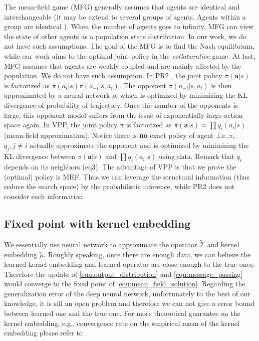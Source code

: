 \documentclass[11pt,a4paper]{article}
\theoremstyle{definition}
\begin{document}
The mean-field game (MFG) \citep{huang2006large} generally assumes that agents are identical and interchangeable (it may be extend to several groups of agents.  Agents within a group are identical ). When the number of agents goes to infinity,  MFG can view the state of other agents as a population state distribution. In our work, we do not have such assumptions. The goal of the MFG is to find the Nash equilibrium, while our work aims to the optimal joint policy in the \emph{collaborative} game. At last, MFG assumes that agents are weakly coupled and are mainly affected by the population. We do not have such assumption. In PR2 \citep{wen2018probabilistic}, the joint policy $ \pi(\bm{a}|s)$ is factorized as $\pi(a_i|s)\pi(a_{-i}|s,a_{i})$. The opponent $\pi(a_{-i}|s,a_{i})$ is then approximated  by a neural network $\rho$, which is  optimized by minimizing the KL divergence of probability of trajectory. Once the number of the opponents is large, this opponent model  suffers from the issue of exponentially large action space again. In VPP, the joint policy $\pi$ is factorized as $\pi(\bm{a}|s)\approx \prod q_i(a_i|s)$ (mean-field approximation). Notice there is \textbf{no} exact policy of agent ,i.e.,$\pi_i$. $q_j, j\neq i$ actually approximate the opponent and is optimized by minimizing the KL divergence between $\pi(\bm{a}|s)$ and $\prod q_i(a_i|s)$ using data. Remark that $q_i$ depends on its neighbors (eq3). The advantage of VPP is that we prove the (optimal) policy is MRF. Thus we can leverage the structural information (thus reduce the search space) by the probabilistic inference, while PR2 does not consider such information.  
\subsection{Fixed point with kernel embedding}


We essentially use neural network to approximate the operator $\tilde{\mathcal{T}}$ and kernel embedding $\tilde{\mu}$.  Roughly speaking, once there are enough data, we can believe the learned kernel embedding and learned operator are close enough to the true ones. Therefore the update of  \eqref{equ:output_distribution} and \eqref{equ:message_passing}  would converge to the fixed point of  \eqref{equ:mean_field_solution}. Regarding the generalization error of the deep neural network, unfortunately to the best of our knowledge, it is sill an open problem and therefore we can not give a error bound between learned one and the true one.
For more theoretical guarantee on the kernel embedding, e.g.,  convergence rate on the empirical mean of the kernel embedding please refer to \citep{smola2007hilbert}. 
\end{document}
